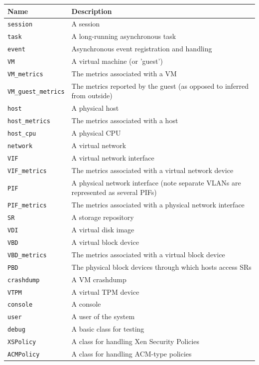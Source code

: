 \begin{center}\begin{tabular}{|lp{10cm}|}
\hline
Name & Description \\
\hline
{\tt session} & A session \\
{\tt task} & A long-running asynchronous task \\
{\tt event} & Asynchronous event registration and handling \\
{\tt VM} & A virtual machine (or 'guest') \\
{\tt VM\_metrics} & The metrics associated with a VM \\
{\tt VM\_guest\_metrics} & The metrics reported by the guest (as opposed to inferred from outside) \\
{\tt host} & A physical host \\
{\tt host\_metrics} & The metrics associated with a host \\
{\tt host\_cpu} & A physical CPU \\
{\tt network} & A virtual network \\
{\tt VIF} & A virtual network interface \\
{\tt VIF\_metrics} & The metrics associated with a virtual network device \\
{\tt PIF} & A physical network interface (note separate VLANs are represented as several PIFs) \\
{\tt PIF\_metrics} & The metrics associated with a physical network interface \\
{\tt SR} & A storage repository \\
{\tt VDI} & A virtual disk image \\
{\tt VBD} & A virtual block device \\
{\tt VBD\_metrics} & The metrics associated with a virtual block device \\
{\tt PBD} & The physical block devices through which hosts access SRs \\
{\tt crashdump} & A VM crashdump \\
{\tt VTPM} & A virtual TPM device \\
{\tt console} & A console \\
{\tt user} & A user of the system \\
{\tt debug} & A basic class for testing \\
{\tt XSPolicy} & A class for handling Xen Security Policies \\
{\tt ACMPolicy} & A class for handling ACM-type policies \\
\hline
\end{tabular}\end{center}
